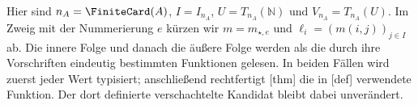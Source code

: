 Hier sind \(n_A=\FiniteCard(A)\), \(I=I_{n_A}\),
\(U=T_{n_A}(\mathbb N)\) und \(V_{n_A}=T_{n_A}(U)\).
Im Zweig mit der Nummerierung \(e\) kürzen wir
\(m=m_{\star,e}\) und \(\ell_i=(m(i,j))_{j\in I}\) ab.
Die innere Folge und danach die äußere Folge werden als die durch ihre
Vorschriften eindeutig bestimmten Funktionen gelesen. In beiden Fällen
wird zuerst jeder Wert typisiert; anschließend rechtfertigt
[thm] die in
[def] verwendete Funktion.
Der dort definierte verschachtelte Kandidat bleibt dabei unverändert.
